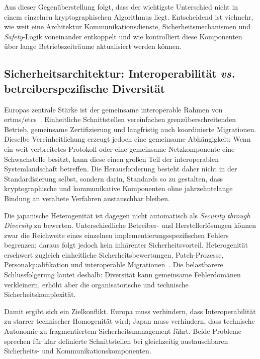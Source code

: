 \documentclass[runningheads]{res/llncs}
\begin{document}
Aus dieser Gegenüberstellung folgt, dass der wichtigste Unterschied nicht in einem einzelnen kryptographischen Algorithmus liegt. Entscheidend ist vielmehr, wie weit eine Architektur Kommunikationsdienste, Sicherheitsmechanismen und \textit{Safety}-Logik voneinander entkoppelt und wie kontrolliert diese Komponenten über lange Betriebszeiträume aktualisiert werden können.

\subsection{Sicherheitsarchitektur: Interoperabilität \textit{vs.} betreiberspezifische Diversität}
\label{sec:Sicherheitsarchitektur_Interoperabilität_vs_Betreiberspezifische_Diversität}
Europas zentrale Stärke ist der gemeinsame interoperable Rahmen von \gls{ertms}/\gls{etcs}~\parencite[S. 49]{trinckaufETCS2024}. Einheitliche Schnittstellen vereinfachen grenzüberschreitenden Betrieb, gemeinsame Zertifizierung und langfristig auch koordinierte Migrationen. Dieselbe Vereinheitlichung erzeugt jedoch eine gemeinsame Abhängigkeit: Wenn ein weit verbreitetes Protokoll oder eine gemeinsame Netzkomponente eine Schwachstelle besitzt, kann diese einen großen Teil der interoperablen Systemlandschaft betreffen. Die Herausforderung besteht daher nicht in der Standardisierung selbst, sondern darin, Standards so zu gestalten, dass kryptographische und kommunikative Komponenten ohne jahrzehntelange Bindung an veraltete Verfahren austauschbar bleiben.

Die japanische Heterogenität ist dagegen nicht automatisch als \textit{Security through Diversity} zu bewerten. Unterschiedliche Betreiber- und Herstellerlösungen können zwar die Reichweite eines einzelnen implementierungsspezifischen Fehlers begrenzen; daraus folgt jedoch kein inhärenter Sicherheitsvorteil. Heterogenität erschwert zugleich einheitliche Sicherheitsbewertungen, Patch-Prozesse, Personalqualifikation und interoperable Migrationen~\parencite[S. 47--49]{yanaseJapanese2011}. Die belastbarere Schlussfolgerung lautet deshalb: Diversität kann gemeinsame Fehlerdomänen verkleinern, erhöht aber die organisatorische und technische Sicherheitskomplexität.

Damit ergibt sich ein Zielkonflikt. Europa muss verhindern, dass Interoperabilität zu starrer technischer Homogenität wird; Japan muss verhindern, dass technische Autonomie zu fragmentiertem Sicherheitsmanagement führt. Beide Probleme sprechen für klar definierte Schnittstellen bei gleichzeitig austauschbaren Sicherheits- und Kommunikationskomponenten.
\end{document}
